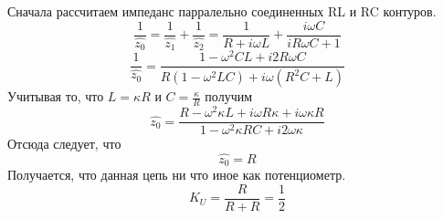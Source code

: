 Сначала рассчитаем импеданс парралельно соединенных RL и RC контуров.
\begin{equation}
	\frac{1}{\hat{z_0}}=\frac{1}{\hat{z_1}}+\frac{1}{\hat{z_2}}=\frac{1}{R+i\omega L}+\frac{i\omega C}{iR\omega C+1}
\end{equation}
\begin{equation}
\frac{1}{\hat{z_0}}=\frac{1-\omega^2 CL+i2R\omega C}{R(1-\omega^2 LC)+i\omega(R^2C+L)}
\end{equation}
Учитывая то, что $L=\kappa R$ и $C=\frac{\kappa}{R}$ получим
\begin{equation}
	\hat{z_0}=\frac{R-\omega^2\kappa L+i\omega R\kappa +i\omega \kappa R}{1-\omega^2\kappa RC+i2\omega\kappa}
\end{equation}
Отсюда следует, что
\begin{equation}
	\hat{z_0}=R
\end{equation}
Получается, что данная цепь ни что иное как потенциометр. 
\begin{equation}
	K_U=\frac{R}{R+R}=\frac{1}{2}
\end{equation}
